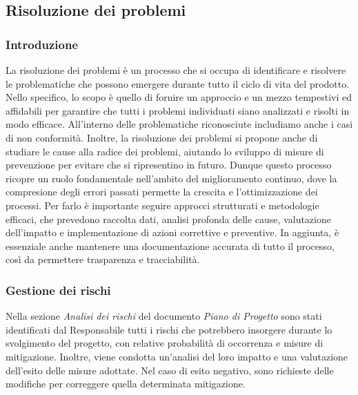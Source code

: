\subsection{Risoluzione dei problemi}
\subsubsection{Introduzione}
La risoluzione dei problemi è un processo che si occupa di identificare e risolvere le problematiche che possono emergere durante tutto il ciclo
di vita del prodotto. Nello specifico, lo scopo è quello di fornire un approccio e un mezzo tempestivi ed affidabili per garantire che tutti
i problemi individuati siano analizzati e risolti in modo efficace. All'interno delle problematiche riconosciute includiamo anche i casi di non
conformità. Inoltre, la risoluzione dei problemi si propone anche di studiare le cause alla radice dei problemi, aiutando lo sviluppo di misure
di prevenzione per evitare che si ripresentino in futuro. Dunque  questo processo ricopre un ruolo fondamentale nell'ambito del miglioramento
continuo, dove la compresione degli errori passati permette la crescita e l'ottimizzazione dei processi. Per farlo è importante seguire
approcci strutturati e metodologie efficaci, che prevedono raccolta dati, analisi profonda delle cause, valutazione dell'impatto e implementazione
di azioni correttive e preventive. In aggiunta, è essenziale anche mantenere una documentazione accurata di tutto il processo, così da
permettere trasparenza e tracciabilità.

\subsubsection{Gestione dei rischi}
Nella sezione \textit{Analisi dei rischi} del documento \textit{Piano di Progetto} sono stati identificati dal Responsabile tutti i rischi 
che potrebbero insorgere durante lo svolgimento del progetto, con relative probabilità di occorrenza e misure di mitigazione. Inoltre,
viene condotta un'analisi del loro impatto e una valutazione dell'esito delle misure adottate. Nel caso di esito negativo, sono richieste
delle modifiche per correggere quella determinata mitigazione.

